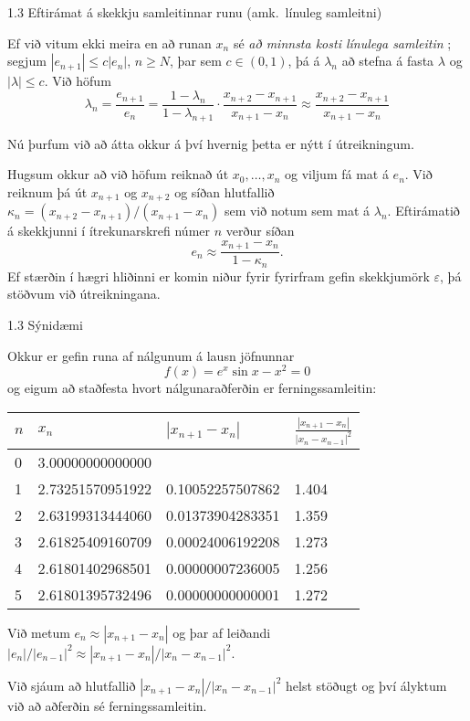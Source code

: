 %
\begin{frame}{1.3 Eftirámat á skekkju samleitinnar runu (amk.~línuleg samleitni)} 


Ef við vitum ekki meira en að runan $x_n$ sé {\it að minnsta kosti
  línulega samleitin} ; segjum $|e_{n+1}|\leq c|e_n|$, $n\geq N$, 
þar sem $c\in(0,1)$, þá á $\lambda_n$ að stefna á fasta $\lambda$ 
og $|\lambda|\leq c$. Við höfum
\begin{equation*}
    \lambda_n = \dfrac{e_{n+1}}{e_n} = 
    \dfrac{1-\lambda_n}{1-\lambda_{n+1}}
    \cdot\dfrac{x_{n+2}-x_{n+1}}{x_{n+1}-x_n}\approx 
    \dfrac{x_{n+2}-x_{n+1}}{x_{n+1}-x_n}
\end{equation*}

\pause
Nú þurfum við að átta okkur á því hvernig þetta er nýtt í
útreikningum. 

\pause
\smallskip
Hugsum okkur að við höfum reiknað út
$x_0,\dots,x_n$ og viljum fá mat á $e_n$. \pause Við reiknum þá  út $x_{n+1}$
og  $x_{n+2}$ og síðan hlutfallið $\kappa_n=(x_{n+2} - x_{n+1})/(x_{n+1} -
x_n)$ sem við notum sem mat á $\lambda_n$.  \pause Eftirámatið á skekkjunni í
ítrekunarskrefi númer $n$ verður síðan 
\begin{equation*}
    e_n\approx \dfrac{x_{n+1}-x_n}{1-\kappa_n}.
\end{equation*}
\pause
\smallskip
Ef stærðin í hægri hliðinni er komin niður fyrir fyrirfram 
gefin skekkjumörk $\varepsilon$, þá stöðvum við útreikningana.
\end{frame}
%
%
\begin{frame}{1.3 Sýnidæmi} 

Okkur er gefin runa af nálgunum á lausn jöfnunnar
\begin{equation*}
    f(x) = e^x\sin x-x^2 = 0
\end{equation*}
og eigum að staðfesta hvort nálgunaraðferðin er ferningssamleitin:

\pause
\begin{center}
\begin{tabular}{l|l|l|l|}
$n$  & $x_n$ &$|x_{n+1}-x_n|$ &  $\frac{|x_{n+1}-x_n|}{|x_n-x_{n-1}|^2}$\\ \hline 
   0&   3.00000000000000 & & \\
   1&   2.73251570951922 &  0.10052257507862 &  1.404\\
   2&   2.63199313444060 &  0.01373904283351 &  1.359\\
   3&  2.61825409160709  & 0.00024006192208  & 1.273\\
   4&   2.61801402968501 &  0.00000007236005 &  1.256\\
   5&   2.61801395732496 &  0.00000000000001 &  1.272\\
\end{tabular}   
\end{center}

\pause
\smallskip
Við metum $e_n\approx |x_{n+1}-x_n|$ og þar af leiðandi 
$|e_n|/|e_{n-1}|^2\approx |x_{n+1}-x_n|/|x_n-x_{n-1}|^2$.

\pause
Við sjáum að hlutfallið $|x_{n+1}-x_n|/|x_n-x_{n-1}|^2$ helst
stöðugt og því ályktum við að aðferðin sé ferningssamleitin.
\end{frame}


